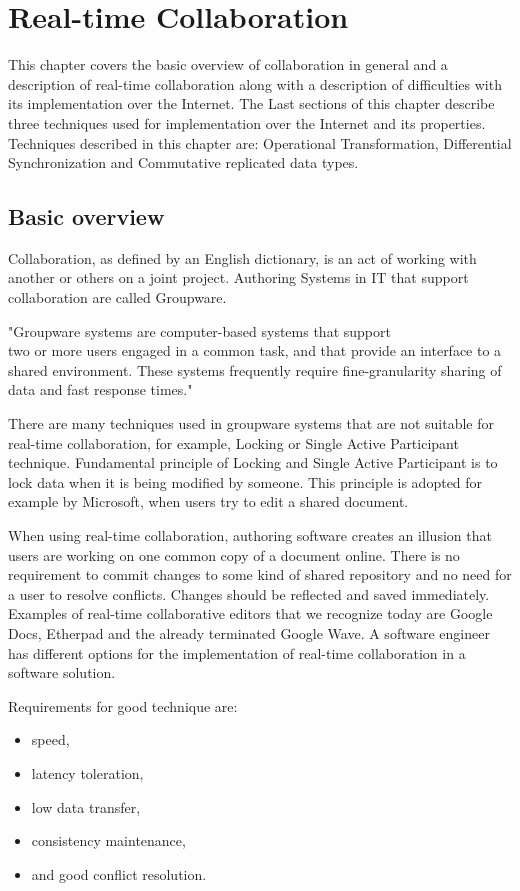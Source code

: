 \documentclass[12pt,oneside]{fithesis2}
\begin{document}
\chapter{Real-time Collaboration}
This chapter covers the basic overview of collaboration in general and a description of real-time collaboration along with a description of difficulties with its implementation over the Internet. The Last sections of this chapter describe three techniques used for implementation over the Internet and its properties. Techniques described in this chapter are: Operational Transformation, Differential Synchronization and Commutative replicated data types.
\section{Basic overview}
Collaboration, as defined by an English dictionary, is an act of working with another or others on a joint project. Authoring Systems in IT that support collaboration are called Groupware. \par "Groupware systems are computer-based systems that support \\two or more users engaged in a common task, and that provide an interface to a shared environment. These systems frequently require fine-granularity sharing of data and fast response times." \cite{Ellis} \par There are many techniques used in groupware systems that are not suitable for real-time collaboration, for example, Locking or Single Active Participant technique. Fundamental principle of Locking and Single Active Participant is to lock data when it is being modified by someone. This principle is adopted for example by Microsoft, when users try to edit a shared document. \par When using real-time collaboration, authoring software creates an illusion that users are working on one common copy of a document online. There is no requirement to commit changes to some kind of shared repository and no need for a user to resolve conflicts. Changes should be reflected and saved immediately. Examples of real-time collaborative editors that we recognize today are Google Docs, Etherpad and the already terminated Google Wave. A software engineer has different options for the implementation of real-time collaboration in a software solution. \par Requirements for good technique are: 
\begin{itemize}
\item speed,
\item latency toleration,
\item low data transfer,
\item consistency maintenance,
\item and good conflict resolution.
\end{itemize}
\end{document}
